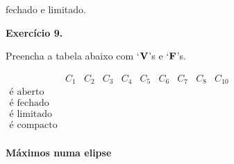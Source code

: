 \documentclass[oneside,12pt]{article}
\begin{document}
{{fechado e limitado.




\bsk
\bsk
\bsk

{\bf Exercício 9.}

Preencha a tabela abaixo com `$\mathbf{V}$'s e `$\mathbf{F}$'s.

\bsk

$\begin{array}{lcccccccccc}
   & C_1
   & C_2
   & C_3
   & C_4
   & C_5
   & C_6
   & C_7
   & C_8
   & C_{10} \\
   \text{é aberto} \\
   \text{é fechado} \\
   \text{é limitado} \\
   \text{é compacto} \\
 \end{array}
$

}}


\newpage

{\bf Máximos numa elipse}
\end{document}
